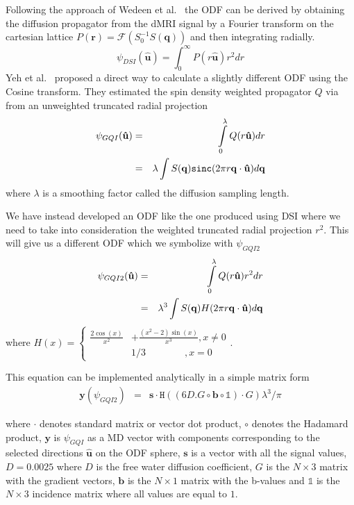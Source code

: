 \documentclass[9pt,conference,a4paper]{IEEEtran}
\begin{document}
Following the approach of Wedeen et al.~\cite{WWS+08} 
the ODF can be derived by obtaining the diffusion propagator from the dMRI signal
by a Fourier transform on the cartesian lattice  $P(\mathbf{r})=\mathcal{F}(S_0^{-1}S(\mathbf{q}))$ and then integrating radially. 
\begin{equation}
\psi_{DSI}(\hat{\mathbf{u}})=\int_{0}^{\infty}P(r\hat{\mathbf{u}})r^{2}dr\label{eq:ODF_DSI}
\end{equation}
Yeh
et al.~\cite{Yeh2010} proposed a direct way to calculate a slightly
different ODF using the Cosine transform. 
They estimated the spin density weighted propagator $Q$ via
from an unweighted truncated radial projection
\begin{eqnarray}
\psi_{GQI}(\mathbf{\hat{u}}) & = & \intop_{0}^{\lambda}Q(r\mathbf{\hat{u}})dr\label{eq:SDF}\nonumber\\
 & = & \lambda\int S(\mathbf{q})\mathtt{sinc}(2\pi r\mathbf{q}\cdot\mathbf{\hat{u}})d\mathbf{q}
\end{eqnarray}
where $\lambda$ is a smoothing factor called the diffusion sampling length.

We have instead developed an ODF like the one produced using
DSI where we need to take into consideration the weighted truncated
radial projection $r^2$. This will give us a different ODF which we symbolize
with $\psi_{GQI2}$\begin{eqnarray}
\psi_{GQI2}(\mathbf{\hat{u}}) & = & \intop_{0}^{\lambda}Q(r\mathbf{\hat{u}})r^{2}dr\nonumber\label{eq:SDF2}\\
 & = & \lambda^{3}\int S(\mathbf{q})H(2\pi r\mathbf{q}\cdot\mathbf{\hat{u}})d\mathbf{q}\end{eqnarray}
\noindent where $H(x)=\begin{cases}
\frac{2\cos(x)}{x^{2}} & +\frac{(x^{2}-2)\sin(x)}{x^{3}},x\neq0\\
 & 1/3\qquad\qquad,x=0\end{cases}$.
\begin{flushleft}
This equation can be implemented analytically in a simple matrix form
\begin{eqnarray}
\mathbf{y}({\psi}_{GQI2}) & = & \mathbf{s}\cdot\mathtt{H}((6D.G\circ\mathbf{b}\circ\mathbb{1})\cdot G)\lambda^{3}/\pi\label{eq:GQI2}
\end{eqnarray}

\par\end{flushleft}

\begin{flushleft}
where $\cdot$ denotes standard matrix or vector dot product, $\circ$
denotes the Hadamard product, $\mathbf{y}$ is $\psi_{GQI}$ as a
MD vector with components corresponding to the selected
directions $\hat{\mathbf{u}}$ on the ODF sphere, $\mathbf{s}$ is
a vector with all the signal values, $D=0.0025$
where $D$ is the free water diffusion coefficient,
$G$ is the $N\times3$ matrix with the gradient vectors, $\mathbf{b}$
is the $N\times1$ matrix with the b-values and $\mathbb{1}$ is the
$N\times3$ incidence matrix where all values are equal to $1$.
\par\end{flushleft}
\end{document}
